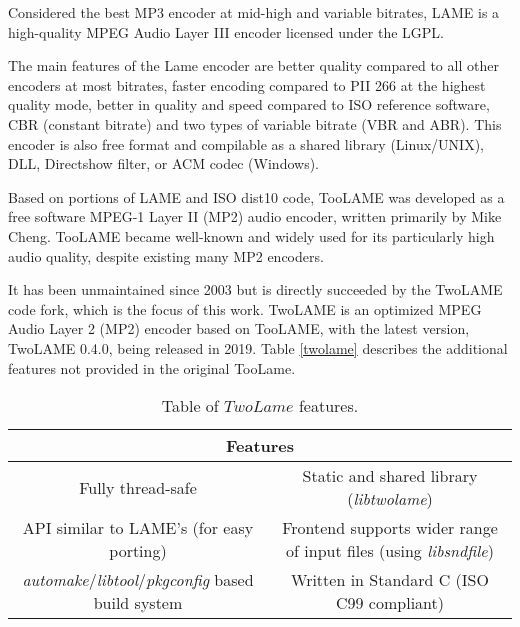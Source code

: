 Considered the best MP3 encoder at mid-high and variable bitrates, LAME \cite{lame} is a high-quality MPEG Audio Layer III encoder licensed under the LGPL.

The main features of the Lame encoder are better quality compared to all other encoders at most bitrates, faster encoding compared to PII 266 at the highest quality mode, better in quality and speed compared to ISO reference software, CBR (constant bitrate) and two types of variable bitrate (VBR and ABR). This encoder is also free format and compilable as a shared library (Linux/UNIX), DLL, Directshow filter, or ACM codec (Windows).

Based on portions of LAME and ISO dist10 code, TooLAME \cite{toolame} was developed as a free software MPEG-1 Layer II (MP2) audio encoder, written primarily by Mike Cheng.
TooLAME became well-known and widely used for its particularly high audio quality, despite existing many MP2 encoders.

It has been unmaintained since 2003 but is directly succeeded by the TwoLAME \cite{twolame} code fork, which is the focus of this work.
TwoLAME is an optimized MPEG Audio Layer 2 (MP2) encoder based on TooLAME, with the latest version, TwoLAME 0.4.0, being released in 2019.
Table \ref{twolame} describes the additional features not provided in the original TooLame.

\begin{table}[h]
    \centering
    \begin{tabular}{|c|c|}
        \hline
        \multicolumn{2}{|c|}{\textbf{Features}} \\
        \hline
         Fully thread-safe & Static and shared library (\textit{libtwolame}) \\
         \hline
         API similar to LAME's (for easy porting) & Frontend supports wider range of input files (using \textit{libsndfile}) \\
         \hline
         \textit{automake}/\textit{libtool}/\textit{pkgconfig} based build system & Written in Standard C (ISO C99 compliant)\\
         \hline
    \end{tabular}
    \caption{Table of $TwoLame$ features.}
    \label{ipbloq}
\end{table}
